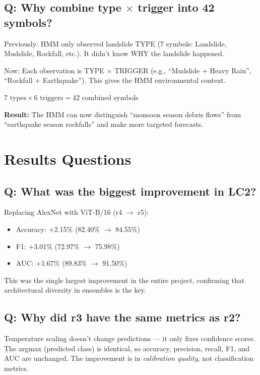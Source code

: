 \documentclass[11pt]{article}
\begin{document}
\subsection{Q: Why combine type $\times$ trigger into 42 symbols?}

Previously: HMM only observed landslide TYPE (7 symbols: Landslide, Mudslide, Rockfall, etc.). It didn't know WHY the landslide happened.

Now: Each observation is TYPE $\times$ TRIGGER (e.g., ``Mudslide + Heavy Rain'', ``Rockfall + Earthquake''). This gives the HMM environmental context.

$7 \text{ types} \times 6 \text{ triggers} = 42 \text{ combined symbols}$

\textbf{Result:} The HMM can now distinguish ``monsoon season debris flows'' from ``earthquake season rockfalls'' and make more targeted forecasts.

\section{Results Questions}

\subsection{Q: What was the biggest improvement in LC2?}

Replacing AlexNet with ViT-B/16 (r4 $\to$ r5):
\begin{itemize}[noitemsep]
    \item Accuracy: +2.15\% (82.40\% $\to$ 84.55\%)
    \item F1: +3.01\% (72.97\% $\to$ 75.98\%)
    \item AUC: +1.67\% (89.83\% $\to$ 91.50\%)
\end{itemize}

This was the single largest improvement in the entire project, confirming that architectural diversity in ensembles is the key.

\subsection{Q: Why did r3 have the same metrics as r2?}

Temperature scaling doesn't change predictions --- it only fixes confidence scores. The argmax (predicted class) is identical, so accuracy, precision, recall, F1, and AUC are unchanged. The improvement is in \textit{calibration quality}, not classification metrics.
\end{document}
